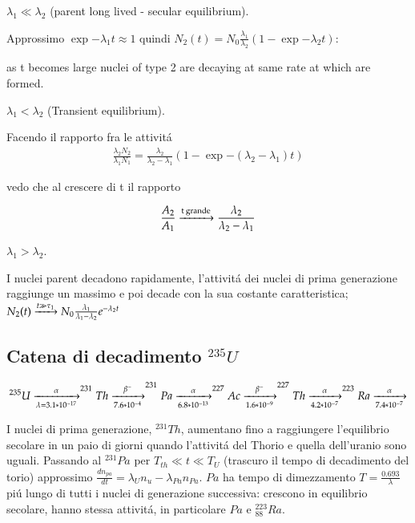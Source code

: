 \documentclass[main.tex]{subfiles}
\begin{document}
\begin{enumerate*}

\item $\lambda_1\ll\lambda_2$ (parent long lived - secular equilibrium).

Approssimo $\exp{-\lambda_1}t\approx1$ quindi $N_2(t)=N_0\frac{\lambda_1}{\lambda_2}(1-\exp{-\lambda_2 t})$:

as t becomes large nuclei of type 2 are decaying at same rate at which are formed. 


\item $\lambda_1<\lambda_2$ (Transient equilibrium).

Facendo il rapporto fra le attivit\'a
\begin{align*}
\frac{\lambda_2N_2}{\lambda_1N_1}=\frac{\lambda_2}{\lambda_2-\lambda_1}(1-\exp{-(\lambda_2-\lambda_1)t})
\end{align*}

vedo che al crescere di t il rapporto

\begin{align*}
\frac{A_2}{A_1}\xrightarrow{\text{t grande}}\frac{\lambda_2}{\lambda_2-\lambda_1}
\end{align*}


\item $\lambda_1>\lambda_2$.

I nuclei parent decadono rapidamente, l'attivit\'a dei nuclei di prima generazione raggiunge un massimo e poi decade con la sua costante caratteristica; $N_2(t)\xrightarrow{t\gg\tau_1}N_0\frac{\lambda_1}{\lambda_1-\lambda_2}e^{-\lambda_2t}$

\end{enumerate*}

\subsection{Catena di decadimento $^{235}U$}
\begin{align*}
^{235}U\xrightarrow[\lambda=3.1*10^{-17}]{\alpha}^{231}Th\xrightarrow[7.6*10^{-4}]{\beta^-}^{231}Pa\xrightarrow[6.8*10^{-13}]{\alpha}^{227}
Ac\xrightarrow[1.6*10^{-9}]{\beta^-}^{227}Th\xrightarrow[4.2*10^{-7}]{\alpha}^{223}Ra\xrightarrow[7.4*10^{-7}]{\alpha}
\end{align*}

I nuclei di prima generazione, $^{231}Th$, aumentano fino a raggiungere l'equilibrio secolare in un paio di giorni quando l'attivit\'a del Thorio e quella dell'uranio sono uguali.
Passando al $^{231}Pa$ per $T_{th}\ll t\ll T_U$ (trascuro il tempo di decadimento del torio) approssimo $\frac{dn_{pa}}{dt}=\lambda_Un_u-\lambda_{Pa}n_{Pa}$. $Pa$ ha tempo di dimezzamento $T=\frac{0.693}{\lambda}$ pi\'u lungo di tutti i nuclei di generazione successiva: crescono in equilibrio secolare, hanno stessa attivit\'a, in particolare $Pa$ e $^{223}_{88}Ra$. 
\end{document}

